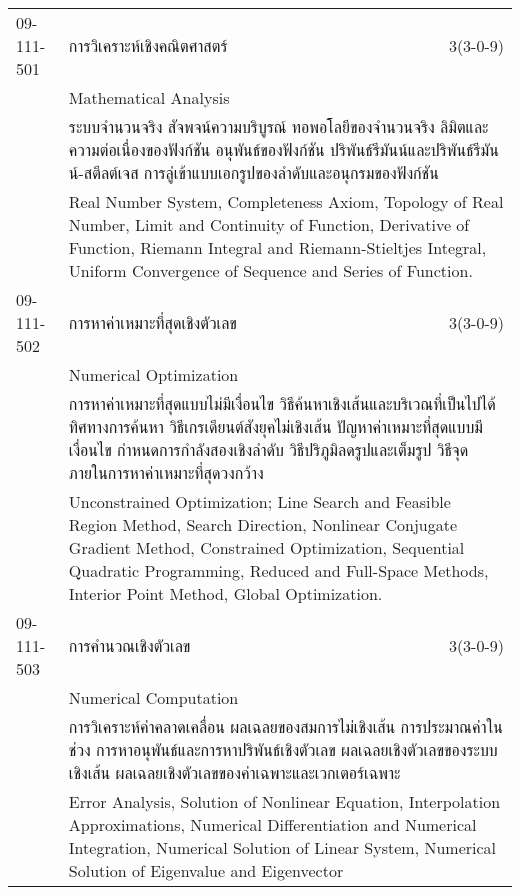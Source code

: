 \begin{longtable}{p{}p{}r{}}
09-111-501 & การวิเคราะห์เชิงคณิตศาสตร์ & 3(3-0-9)\\*
 & Mathematical Analysis & \phantom{x} \vspace{3mm} \\*
&  \multicolumn{2}{p{0.75\textwidth}}{ระบบจำนวนจริง สัจพจน์ความบริบูรณ์ ทอพอโลยีของจำนวนจริง ลิมิตและความต่อเนื่องของฟังก์ชัน อนุพันธ์ของฟังก์ชัน ปริพันธ์รีมันน์และปริพันธ์รีมันน์-สตีลต์เจส การลู่เข้าแบบเอกรูปของลำดับและอนุกรมของฟังก์ชัน} \vspace{3mm} \\*
&  \multicolumn{2}{p{0.75\textwidth}}{Real Number System, Completeness Axiom, Topology of Real Number, Limit and Continuity of Function, Derivative of Function, Riemann Integral and Riemann-Stieltjes Integral, Uniform Convergence of Sequence and Series of Function.} \vspace{8mm} \\*
09-111-502 & การหาค่าเหมาะที่สุดเชิงตัวเลข & 3(3-0-9)\\*
 & Numerical Optimization & \phantom{x} \vspace{3mm} \\*
&  \multicolumn{2}{p{0.75\textwidth}}{การหาค่าเหมาะที่สุดแบบไม่มีเงื่อนไข วิธีค้นหาเชิงเส้นและบริเวณที่เป็นไปได้ ทิศทางการค้นหา วิธีเกรเดียนต์สังยุคไม่เชิงเส้น ปัญหาค่าเหมาะที่สุดแบบมีเงื่อนไข กำหนดการกำลังสองเชิงลำดับ วิธีปริภูมิลดรูปและเต็มรูป วิธีจุดภายในการหาค่าเหมาะที่สุดวงกว้าง} \vspace{3mm} \\*
&  \multicolumn{2}{p{0.75\textwidth}}{Unconstrained Optimization; Line Search and Feasible Region Method, Search Direction, Nonlinear Conjugate Gradient Method, Constrained Optimization, Sequential Quadratic Programming, Reduced and Full-Space Methods, Interior Point Method, Global Optimization.} \vspace{8mm} \\*
09-111-503 & การคำนวณเชิงตัวเลข & 3(3-0-9)\\*
 & Numerical Computation & \phantom{x} \vspace{3mm} \\*
&  \multicolumn{2}{p{0.75\textwidth}}{การวิเคราะห์ค่าคลาดเคลื่อน ผลเฉลยของสมการไม่เชิงเส้น การประมาณค่าในช่วง การหาอนุพันธ์และการหาปริพันธ์เชิงตัวเลข ผลเฉลยเชิงตัวเลขของระบบเชิงเส้น ผลเฉลยเชิงตัวเลขของค่าเฉพาะและเวกเตอร์เฉพาะ} \vspace{3mm} \\*
&  \multicolumn{2}{p{0.75\textwidth}}{Error Analysis, Solution of Nonlinear Equation, Interpolation Approximations, Numerical Differentiation and Numerical Integration, Numerical Solution of Linear System, Numerical Solution of Eigenvalue and Eigenvector} \vspace{8mm} \\*

\end{longtable}
